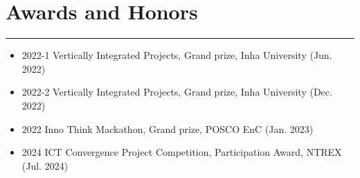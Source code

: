 \documentclass{article} %
\newcommand{\sectionsplitrule}{
  \hrule %
  \vspace{1em} %
}
\begin{document}
\section*{Awards and Honors}
\sectionsplitrule

\begin{itemize}[leftmargin=1.5em, parsep=0.5em] %
    \item 2022-1 Vertically Integrated Projects, Grand prize, Inha University (Jun. 2022)
    \item 2022-2 Vertically Integrated Projects, Grand prize, Inha University (Dec. 2022)
    \item 2022 Inno Think Mackathon, Grand prize, POSCO EnC (Jan. 2023)
    \item 2024 ICT Convergence Project Competition, Participation Award, NTREX (Jul. 2024)
\end{itemize}

%


\end{document}
